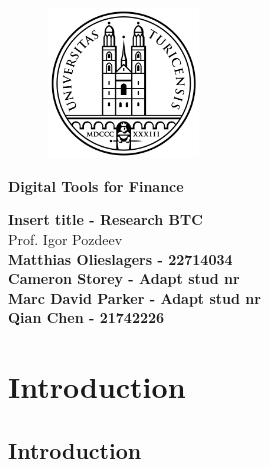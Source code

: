 \documentclass[12pt]{article}
\begin{document}
\pagestyle{empty}

\bigskip

\begin{figure}[htp]
    \centering
    \includegraphics[width=4cm]{uzh logo 2.png}
    \label{fig:UZH}
\end{figure}

\begin{Large}
	\begin{center}
		\textbf{Digital Tools for Finance}
	\end{center}
\end{Large}

\vspace{2cm}

\begin{large}	
	\begin{center}
		\textbf{Insert title - Research BTC} \vspace{0.1cm} \\ {Prof. Igor Pozdeev } \vspace{2cm} \\ \textbf{Matthias Olieslagers - 22714034}  \\ \textbf{Cameron Storey - Adapt stud nr} \\ 
        \textbf{Marc David Parker - Adapt stud nr}\\
        \textbf{Qian Chen - 21742226}\\
	\end{center}
\end{large}

\tableofcontents

\newpage

\bigskip
\section{Introduction}

\subsection*{Introduction}
\end{document}
